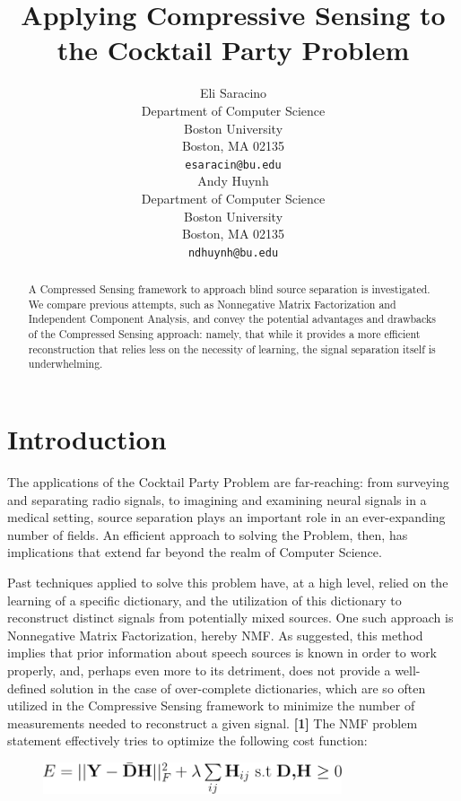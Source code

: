 \documentclass{article}
\title{Applying Compressive Sensing to the Cocktail Party Problem}
\author{
  Eli Saracino \\
  Department of Computer Science\\
  Boston University\\
  Boston, MA 02135 \\
  \texttt{esaracin@bu.edu} \\
  \And
  Andy Huynh \\
  Department of Computer Science \\
  Boston University \\
  Boston, MA 02135 \\
  \texttt{ndhuynh@bu.edu} \\
}
\begin{document}
\maketitle

\begin{abstract}
  A Compressed Sensing framework to approach blind source separation is investigated. We compare previous attempts, such as Nonnegative Matrix Factorization and Independent Component Analysis, and convey the potential advantages and drawbacks of the Compressed Sensing approach: namely, that while it provides a more efficient reconstruction that relies less on the necessity of learning, the signal separation itself is underwhelming.
\end{abstract}

\section{Introduction}
The applications of the Cocktail Party Problem are far-reaching: from surveying and separating radio signals, to imagining and examining neural signals in a medical setting, source separation plays an important role in an ever-expanding number of fields. An efficient approach to solving the Problem, then, has implications that extend far beyond the realm of Computer Science. 

Past techniques applied to solve this problem have, at a high level, relied on the learning of a specific dictionary, and the utilization of this dictionary to reconstruct distinct signals from potentially mixed sources. One such approach is Nonnegative Matrix Factorization, hereby NMF. As suggested, this method implies that prior information about speech sources is known in order to work properly, and, perhaps even more to its detriment, does not provide a well-defined solution in the case of over-complete dictionaries, which are so often utilized in the Compressive Sensing framework to minimize the number of measurements needed to reconstruct a given signal. \textbf{[1]} The NMF problem statement effectively tries to optimize the following cost function: 

\begin{figure}[H]
	\centering
	\includegraphics[width=250pt]{figs/NMF.png}
	\label{Nonnegative Matrix Factorization}
\end{figure}
\end{document}
